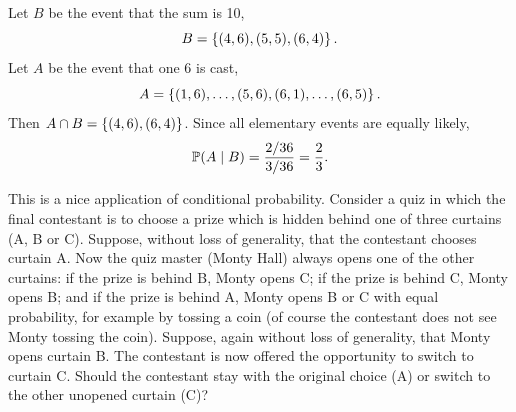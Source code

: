 \begin{solution}
Let $B$ be the event that the sum is 10,
\[
  B = \left\{ (4,6), (5,5), (6,4) \right\}.
\]
Let $A$ be the event that one 6 is cast,
\[
  A = \left\{ (1,6), \ldots, (5,6), (6,1), \ldots, (6,5) \right\}.
\]
Then $A \cap B = \left\{ (4,6), (6,4) \right\}$. Since all elementary events are equally likely,
\[
  \mathbb{P}(A \mid B) = \frac{2/36}{3/36} = \frac23.
\]
\end{solution}

\begin{example}\label{ex:monty-hall}
This is a nice application of conditional probability. Consider a quiz in which the final contestant is to choose a prize which is hidden behind one of three curtains (A, B or C). Suppose, without loss of generality, that the contestant chooses curtain A. Now the quiz master (Monty Hall) always opens one of the other curtains: if the prize is behind B, Monty opens C; if the prize is behind C, Monty opens B; and if the prize is behind A, Monty opens B or C with equal probability, for example by tossing a coin (of course the contestant does not see Monty tossing the coin). Suppose, again without loss of generality, that Monty opens curtain B. The contestant is now offered the opportunity to switch to curtain C. Should the contestant stay with the original choice (A) or switch to the other unopened curtain (C)?
\end{example}

